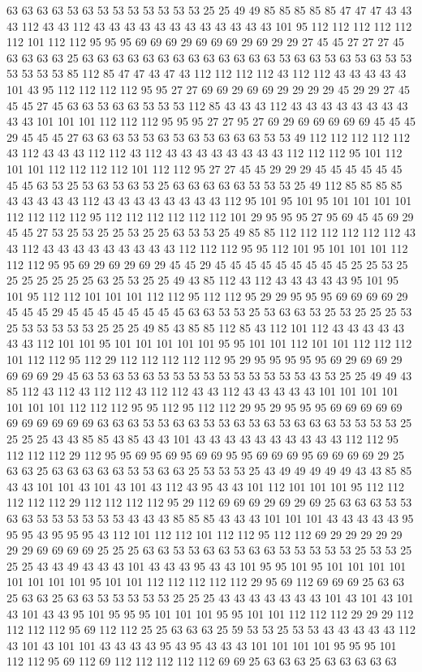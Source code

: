 63 63 63 63 53 63 53 53 53 53 53 53 53 25 25 49 49 85 85 85 85 85 47 47 47 43 43 43 112 43 43 112 43 43 43 43 43 43 43 43 43 43 43 43 101 95 112 112 112 112 112 112 101 112 112 95 95 95 69 69 69 29 69 69 69 29 69 29 29 27 45 45 27 27 27 45 63 63 63 63 25 63 63 63 63 63 63 63 63 63 63 63 63 63 53 63 63 53 63 53 63 53 53 53 53 53 53 85 112 85 47 47 43 47 43 112 112 112 112 43 112 112 43 43 43 43 43 101 43 95 112 112 112 112 95 95 27 27 69 69 29 69 69 29 29 29 29 45 29 29 27 45 45 45 27 45 63 63 53 63 63 53 53 53 112 85 43 43 43 112 43 43 43 43 43 43 43 43 43 43 101 101 101 112 112 112 95 95 95 27 27 95 27 69 29 69 69 69 69 69 45 45 45 29 45 45 45 27 63 63 63 53 53 63 53 63 53 63 63 63 53 53 49 112 112 112 112 112 43 112 43 43 43 112 112 43 112 43 43 43 43 43 43 43 43 112 112 112 95 101 112 101 101 112 112 112 112 101 112 112 95 27 27 45 45 29 29 29 45 45 45 45 45 45 45 45 63 53 25 53 63 53 63 53 25 63 63 63 63 63 53 53 53 25 49 112 85 85 85 85 43 43 43 43 43 112 43 43 43 43 43 43 43 43 112 95 101 95 101 95 101 101 101 101 112 112 112 112 95 112 112 112 112 112 112 101 29 95 95 95 27 95 69 45 45 69 29 45 45 27 53 25 53 25 25 53 25 25 63 53 53 25 49 85 85 112 112 112 112 112 112 43 43 112 43 43 43 43 43 43 43 43 43 112 112 112 95 95 112 101 95 101 101 101 112 112 112 95 95 69 29 69 29 69 29 45 45 29 45 45 45 45 45 45 45 45 45 25 25 53 25 25 25 25 25 25 25 63 25 53 25 25 49 43 85 112 43 112 43 43 43 43 43 95 101 95 101 95 112 112 101 101 101 112 112 95 112 112 95 29 29 95 95 95 69 69 69 69 29 45 45 45 29 45 45 45 45 45 45 45 45 63 63 53 53 25 53 63 63 53 25 53 25 25 25 53 25 53 53 53 53 53 25 25 25 49 85 43 85 85 112 85 43 112 101 112 43 43 43 43 43 43 43 112 101 101 95 101 101 101 101 101 95 95 101 101 112 101 101 112 112 112 101 112 112 95 112 29 112 112 112 112 112 95 29 95 95 95 95 95 69 29 69 69 29 69 69 69 29 45 63 53 63 53 63 53 53 53 53 53 53 53 53 53 53 43 53 25 25 49 49 43 85 112 43 112 43 112 112 43 112 112 43 43 112 43 43 43 43 43 101 101 101 101 101 101 101 112 112 112 95 95 112 95 112 112 29 95 29 95 95 95 69 69 69 69 69 69 69 69 69 69 69 63 63 63 53 53 63 63 53 53 63 53 63 53 63 63 63 53 53 53 53 25 25 25 25 43 43 85 85 43 85 43 43 101 43 43 43 43 43 43 43 43 43 43 112 112 95 112 112 112 29 112 95 95 69 95 69 95 69 69 95 95 69 69 69 95 69 69 69 69 29 25 63 63 25 63 63 63 63 63 53 53 63 63 25 53 53 53 25 43 49 49 49 49 49 43 43 85 85 43 43 101 101 43 101 43 101 43 112 43 95 43 43 101 112 101 101 101 95 112 112 112 112 112 29 112 112 112 112 95 29 112 69 69 69 29 69 29 69 25 63 63 63 53 53 63 63 53 53 53 53 53 53 43 43 43 85 85 85 43 43 43 101 101 101 43 43 43 43 43 95 95 95 43 95 95 95 43 112 101 112 112 101 112 112 95 112 112 69 29 29 29 29 29 29 29 69 69 69 69 25 25 25 63 63 53 53 63 63 53 63 63 53 53 53 53 53 25 53 53 25 25 25 43 43 49 43 43 43 101 43 43 43 95 43 43 101 95 95 101 95 101 101 101 101 101 101 101 101 95 101 101 112 112 112 112 112 29 95 69 112 69 69 69 25 63 63 25 63 63 25 63 63 53 53 53 53 53 25 25 25 43 43 43 43 43 43 43 101 43 101 43 101 43 101 43 43 95 101 95 95 95 101 101 101 95 95 101 101 112 112 112 29 29 29 112 112 112 112 95 69 112 112 25 25 63 63 63 25 59 53 53 25 53 53 43 43 43 43 43 112 43 101 43 101 101 43 43 43 43 95 43 95 43 43 43 101 101 101 101 95 95 95 101 112 112 95 69 112 69 112 112 112 112 112 69 69 25 63 63 63 25 63 63 63 63 63 